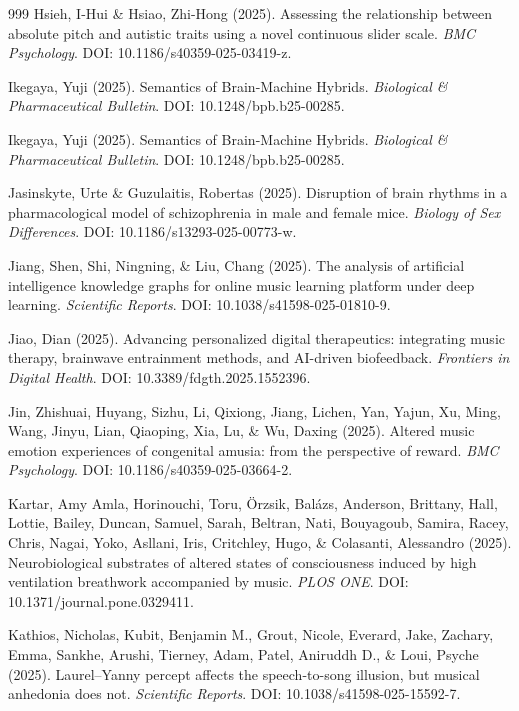 \documentclass[9pt,onecolumn]{article}
\begin{document}
\begin{thebibliography}{999}
Hsieh, I-Hui \& Hsiao, Zhi-Hong (2025). Assessing the relationship between absolute pitch and autistic traits using a novel continuous slider scale. \textit{BMC Psychology}. DOI: 10.1186/s40359-025-03419-z.

Ikegaya, Yuji (2025). Semantics of Brain-Machine Hybrids. \textit{Biological \& Pharmaceutical Bulletin}. DOI: 10.1248/bpb.b25-00285.

Ikegaya, Yuji (2025). Semantics of Brain-Machine Hybrids. \textit{Biological \& Pharmaceutical Bulletin}. DOI: 10.1248/bpb.b25-00285.

Jasinskyte, Urte \& Guzulaitis, Robertas (2025). Disruption of brain rhythms in a pharmacological model of schizophrenia in male and female mice. \textit{Biology of Sex Differences}. DOI: 10.1186/s13293-025-00773-w.

Jiang, Shen, Shi, Ningning, \& Liu, Chang (2025). The analysis of artificial intelligence knowledge graphs for online music learning platform under deep learning. \textit{Scientific Reports}. DOI: 10.1038/s41598-025-01810-9.

Jiao, Dian (2025). Advancing personalized digital therapeutics: integrating music therapy, brainwave entrainment methods, and AI-driven biofeedback. \textit{Frontiers in Digital Health}. DOI: 10.3389/fdgth.2025.1552396.

Jin, Zhishuai, Huyang, Sizhu, Li, Qixiong, Jiang, Lichen, Yan, Yajun, Xu, Ming, Wang, Jinyu, Lian, Qiaoping, Xia, Lu, \& Wu, Daxing (2025). Altered music emotion experiences of congenital amusia: from the perspective of reward. \textit{BMC Psychology}. DOI: 10.1186/s40359-025-03664-2.

Kartar, Amy Amla, Horinouchi, Toru, Örzsik, Balázs, Anderson, Brittany, Hall, Lottie, Bailey, Duncan, Samuel, Sarah, Beltran, Nati, Bouyagoub, Samira, Racey, Chris, Nagai, Yoko, Asllani, Iris, Critchley, Hugo, \& Colasanti, Alessandro (2025). Neurobiological substrates of altered states of consciousness induced by high ventilation breathwork accompanied by music. \textit{PLOS ONE}. DOI: 10.1371/journal.pone.0329411.

Kathios, Nicholas, Kubit, Benjamin M., Grout, Nicole, Everard, Jake, Zachary, Emma, Sankhe, Arushi, Tierney, Adam, Patel, Aniruddh D., \& Loui, Psyche (2025). Laurel–Yanny percept affects the speech-to-song illusion, but musical anhedonia does not. \textit{Scientific Reports}. DOI: 10.1038/s41598-025-15592-7.


\end{thebibliography}
\end{document}
